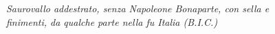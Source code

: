 \begin{figure}[h]
\begin{minipage}{0.45\textwidth}
\emph{Saurovallo addestrato, senza Napoleone Bonaparte, con sella e finimenti, da qualche parte nella fu Italia (B.I.C.)}
	\end{minipage}
\end{figure}

\pagebreak

